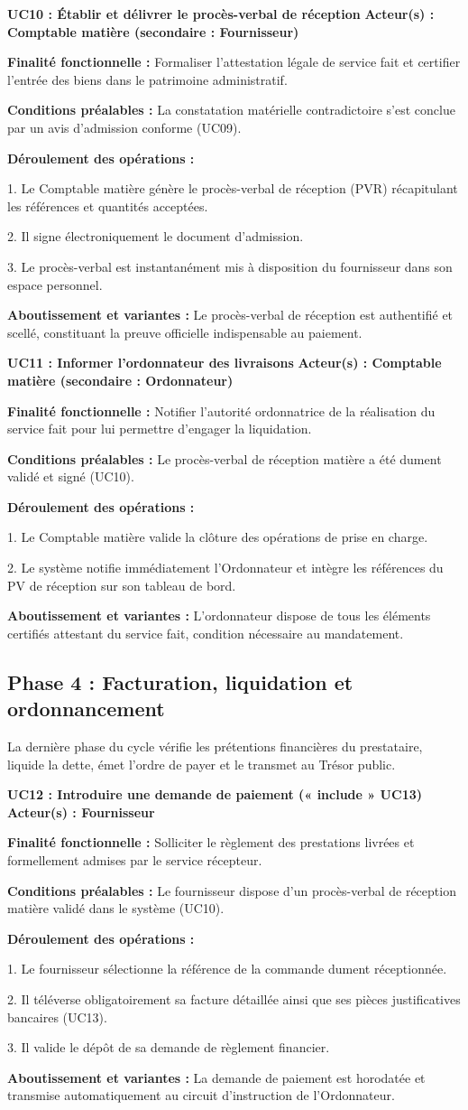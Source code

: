 \documentclass[11pt,a4paper]{article}
\newcommand{\ficheusecase}[6]{
  \vspace{0.45em}
  {\noindent\raggedright\textbf{\sffamily\normalsize\color{BleuInstitutionnel}#1} \hfill {\scriptsize\sffamily\bfseries\color{BleuSecondaire} Acteur(s) : #2}\par}
  \vspace{0.1em}
  {\small\textbf{Finalité fonctionnelle :} #3\par}
  {\small\textbf{Conditions préalables :} #4\par}
  {\small\textbf{Déroulement des opérations :}\par
  \vspace{0.05em}
  #5\par}
  \vspace{0.05em}
  {\small\color{BleuSecondaire}\textbf{Aboutissement et variantes :} #6\par}
  \vspace{0.35em}
}
\begin{document}
\ficheusecase{UC10 : Établir et délivrer le procès-verbal de réception}
{Comptable matière (secondaire : Fournisseur)}
{Formaliser l'attestation légale de service fait et certifier l'entrée des biens dans le patrimoine administratif.}
{La constatation matérielle contradictoire s'est conclue par un avis d'admission conforme (UC09).}
{1. Le Comptable matière génère le procès-verbal de réception (PVR) récapitulant les références et quantités acceptées.\par
2. Il signe électroniquement le document d'admission.\par
3. Le procès-verbal est instantanément mis à disposition du fournisseur dans son espace personnel.}
{Le procès-verbal de réception est authentifié et scellé, constituant la preuve officielle indispensable au paiement.}

\ficheusecase{UC11 : Informer l'ordonnateur des livraisons}
{Comptable matière (secondaire : Ordonnateur)}
{Notifier l'autorité ordonnatrice de la réalisation du service fait pour lui permettre d'engager la liquidation.}
{Le procès-verbal de réception matière a été dument validé et signé (UC10).}
{1. Le Comptable matière valide la clôture des opérations de prise en charge.\par
2. Le système notifie immédiatement l'Ordonnateur et intègre les références du PV de réception sur son tableau de bord.}
{L'ordonnateur dispose de tous les éléments certifiés attestant du service fait, condition nécessaire au mandatement.}

\subsection{Phase 4 : Facturation, liquidation et ordonnancement}

La dernière phase du cycle vérifie les prétentions financières du prestataire, liquide la dette, émet l'ordre de payer et le transmet au Trésor public.

\ficheusecase{UC12 : Introduire une demande de paiement (« include » UC13)}
{Fournisseur}
{Solliciter le règlement des prestations livrées et formellement admises par le service récepteur.}
{Le fournisseur dispose d'un procès-verbal de réception matière validé dans le système (UC10).}
{1. Le fournisseur sélectionne la référence de la commande dument réceptionnée.\par
2. Il téléverse obligatoirement sa facture détaillée ainsi que ses pièces justificatives bancaires (UC13).\par
3. Il valide le dépôt de sa demande de règlement financier.}
{La demande de paiement est horodatée et transmise automatiquement au circuit d'instruction de l'Ordonnateur.}
\end{document}

